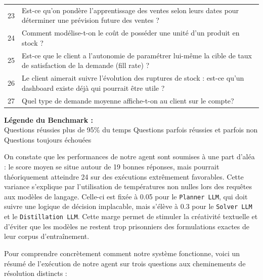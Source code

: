 \begin{longtable}{
    >{\centering\arraybackslash}p{} 
    >{\raggedright\arraybackslash}p{}
}
\rowcolor{hardColor}23 & Est-ce qu'on pondère l'apprentissage des ventes selon leurs dates pour déterminer une prévision future des ventes ? \\
\rowcolor{easyColor} 24 & Comment modélise-t-on le coût de posséder une unité d'un produit en stock ? \\
\rowcolor{intermediateColor} 25 & Est-ce que le client a l'autonomie de paramétrer lui-même la cible de taux de satisfaction de la demande (fill rate) ? \\
\rowcolor{easyColor} 26 & Le client aimerait suivre l'évolution des ruptures de stock : est-ce qu'un dashboard existe déjà qui pourrait être utile ? \\
\rowcolor{easyColor} 27 & Quel type de demande moyenne affiche-t-on au client sur le compte? \\

\end{longtable}

\begin{center}
    \textbf{Légende du Benchmark :} \\ \vspace{0.2cm}
     \footnotesize Questions réussies plus de 95\% du temps \quad
     \footnotesize Questions parfois réussies et parfois non \quad
     \footnotesize Questions toujours échouées
\end{center}

On constate que les performances de notre agent sont soumises à une part d'aléa : le score moyen se situe autour de 19 bonnes réponses, mais pourrait théoriquement atteindre 24 sur des exécutions extrêmement favorables. Cette variance s'explique par l'utilisation de températures non nulles lors des requêtes aux modèles de langage. Celle-ci est fixée à 0.05 pour le \texttt{Planner LLM}, qui doit suivre une logique de décision implacable, mais s'élève à 0.3 pour le \texttt{Solver LLM} et le \texttt{Distillation LLM}. Cette marge permet de stimuler la créativité textuelle et d'éviter que les modèles ne restent trop prisonniers des formulations exactes de leur corpus d'entraînement.

Pour comprendre concrètement comment notre système fonctionne, voici un résumé de l'exécution de notre agent sur trois questions aux cheminements de résolution distincts :

